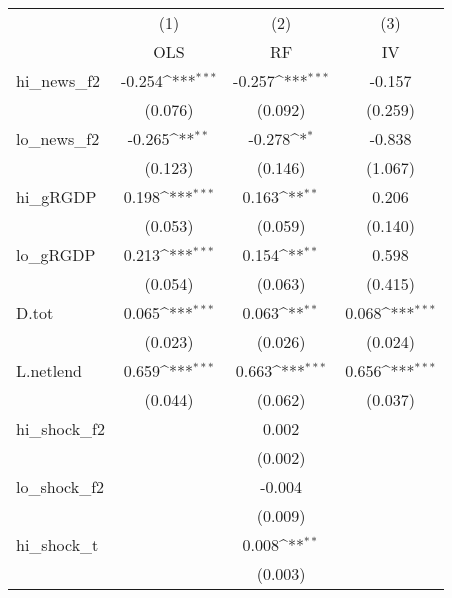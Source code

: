 {
\def\sym#1{\ifmmode^{#1}\else\(^{#1}\)\fi}
\begin{tabular}{l*{3}{c}}
\toprule
            &\multicolumn{1}{c}{(1)}&\multicolumn{1}{c}{(2)}&\multicolumn{1}{c}{(3)}\\
            &\multicolumn{1}{c}{OLS}&\multicolumn{1}{c}{RF}&\multicolumn{1}{c}{IV}\\
\midrule
hi\_news\_f2  &      -0.254\sym{***}&      -0.257\sym{***}&      -0.157         \\
            &     (0.076)         &     (0.092)         &     (0.259)         \\
\addlinespace
lo\_news\_f2  &      -0.265\sym{**} &      -0.278\sym{*}  &      -0.838         \\
            &     (0.123)         &     (0.146)         &     (1.067)         \\
\addlinespace
hi\_gRGDP    &       0.198\sym{***}&       0.163\sym{**} &       0.206         \\
            &     (0.053)         &     (0.059)         &     (0.140)         \\
\addlinespace
lo\_gRGDP    &       0.213\sym{***}&       0.154\sym{**} &       0.598         \\
            &     (0.054)         &     (0.063)         &     (0.415)         \\
\addlinespace
D.tot       &       0.065\sym{***}&       0.063\sym{**} &       0.068\sym{***}\\
            &     (0.023)         &     (0.026)         &     (0.024)         \\
\addlinespace
L.netlend   &       0.659\sym{***}&       0.663\sym{***}&       0.656\sym{***}\\
            &     (0.044)         &     (0.062)         &     (0.037)         \\
\addlinespace
hi\_shock\_f2 &                     &       0.002         &                     \\
            &                     &     (0.002)         &                     \\
\addlinespace
lo\_shock\_f2 &                     &      -0.004         &                     \\
            &                     &     (0.009)         &                     \\
\addlinespace
hi\_shock\_t  &                     &       0.008\sym{**} &                     \\
            &                     &     (0.003)         &                     \\

\end{tabular}}
